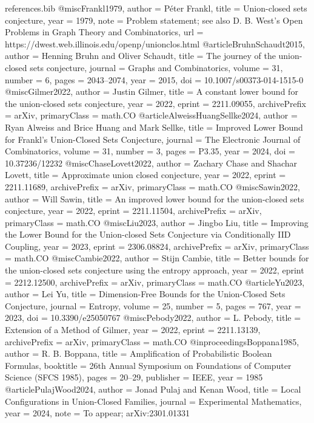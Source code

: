 
\begin{filecontents*}{references.bib}
@misc{Frankl1979,
  author = {P{\'e}ter Frankl},
  title = {Union-closed sets conjecture},
  year = {1979},
  note = {Problem statement; see also D. B. West's Open Problems in Graph Theory and Combinatorics},
  url = {https://dwest.web.illinois.edu/openp/unionclos.html}
}
@article{BruhnSchaudt2015,
  author = {Henning Bruhn and Oliver Schaudt},
  title = {The journey of the union-closed sets conjecture},
  journal = {Graphs and Combinatorics},
  volume = {31},
  number = {6},
  pages = {2043--2074},
  year = {2015},
  doi = {10.1007/s00373-014-1515-0}
}
@misc{Gilmer2022,
  author = {Justin Gilmer},
  title = {A constant lower bound for the union-closed sets conjecture},
  year = {2022},
  eprint = {2211.09055},
  archivePrefix = {arXiv},
  primaryClass = {math.CO}
}
@article{AlweissHuangSellke2024,
  author = {Ryan Alweiss and Brice Huang and Mark Sellke},
  title = {Improved Lower Bound for Frankl's Union-Closed Sets Conjecture},
  journal = {The Electronic Journal of Combinatorics},
  volume = {31},
  number = {3},
  pages = {P3.35},
  year = {2024},
  doi = {10.37236/12232}
}
@misc{ChaseLovett2022,
  author = {Zachary Chase and Shachar Lovett},
  title = {Approximate union closed conjecture},
  year = {2022},
  eprint = {2211.11689},
  archivePrefix = {arXiv},
  primaryClass = {math.CO}
}
@misc{Sawin2022,
  author = {Will Sawin},
  title = {An improved lower bound for the union-closed sets conjecture},
  year = {2022},
  eprint = {2211.11504},
  archivePrefix = {arXiv},
  primaryClass = {math.CO}
}
@misc{Liu2023,
  author = {Jingbo Liu},
  title = {Improving the Lower Bound for the Union-closed Sets Conjecture via Conditionally IID Coupling},
  year = {2023},
  eprint = {2306.08824},
  archivePrefix = {arXiv},
  primaryClass = {math.CO}
}
@misc{Cambie2022,
  author = {Stijn Cambie},
  title = {Better bounds for the union-closed sets conjecture using the entropy approach},
  year = {2022},
  eprint = {2212.12500},
  archivePrefix = {arXiv},
  primaryClass = {math.CO}
}
@article{Yu2023,
  author = {Lei Yu},
  title = {Dimension-Free Bounds for the Union-Closed Sets Conjecture},
  journal = {Entropy},
  volume = {25},
  number = {5},
  pages = {767},
  year = {2023},
  doi = {10.3390/e25050767}
}
@misc{Pebody2022,
  author = {L. Pebody},
  title = {Extension of a Method of Gilmer},
  year = {2022},
  eprint = {2211.13139},
  archivePrefix = {arXiv},
  primaryClass = {math.CO}
}
@inproceedings{Boppana1985,
  author = {R. B. Boppana},
  title = {Amplification of Probabilistic Boolean Formulas},
  booktitle = {26th Annual Symposium on Foundations of Computer Science (SFCS 1985)},
  pages = {20--29},
  publisher = {IEEE},
  year = {1985}
}
@article{PulajWood2024,
  author = {Jonad Pulaj and Kenan Wood},
  title = {Local Configurations in Union-Closed Families},
  journal = {Experimental Mathematics},
  year = {2024},
  note = {To appear; arXiv:2301.01331}
}
\end{filecontents*}

